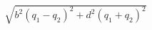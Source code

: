 \documentclass[preview]{standalone}
\begin{document}
\begin{align*}
\sqrt{b^2(q_1 - q_2)^2 + d^2(q_1 + q_2)^2}
\end{align*}
\end{document}
